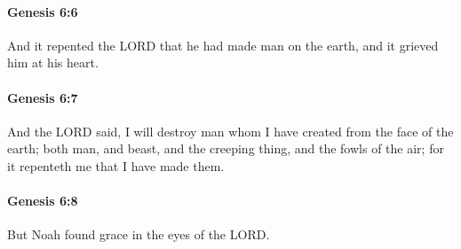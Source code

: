 		\paragraph{Genesis 6:6} %
			\label{GENESIS-6-6}

			And it repented the LORD that he had made man on the earth, and it grieved him at his heart.


		\paragraph{Genesis 6:7} %
			\label{GENESIS-6-7}

			And the LORD said, I will destroy man whom I have created from the face of the earth; both man, and beast, and the creeping thing, and the fowls of the air; for it repenteth me that I have made them.


		\paragraph{Genesis 6:8} %
			\label{GENESIS-6-8}

			But Noah found grace in the eyes of the LORD.


